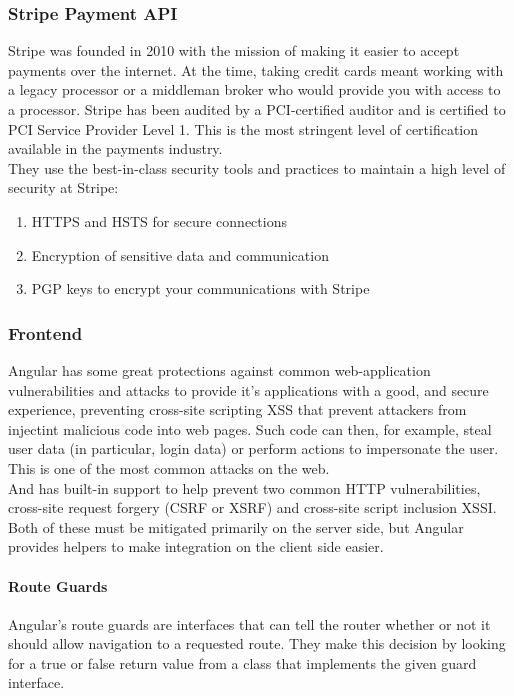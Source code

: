 \subsubsection{Stripe Payment API}
Stripe was founded in 2010 with the mission of making it easier to accept payments over the internet. At the time, taking credit cards meant working with a legacy processor or a middleman broker who would provide you with access to a processor.
Stripe has been audited by a PCI-certified auditor and is certified to PCI Service Provider Level 1. This is the most stringent level of certification available in the payments industry. \\
They use the best-in-class security tools and practices to maintain a high level of security at Stripe:
\begin{enumerate}
      \item HTTPS and HSTS for secure connections
      \item Encryption of sensitive data and communication
      \item PGP keys to encrypt your communications with Stripe
\end{enumerate}
\subsubsection{Frontend}
Angular has some great protections against common web-application vulnerabilities and attacks to provide it's applications with a good, and secure experience, preventing cross-site scripting \ac{XSS} that prevent attackers from injectint malicious code into web pages. Such code can then, for example, steal user data (in particular, login data) or perform actions to impersonate the user. This is one of the most common attacks on the web.\\
And has built-in support to help prevent two common HTTP vulnerabilities, cross-site request forgery (\ac{CSRF} or XSRF) and cross-site script inclusion \ac{XSSI}. Both of these must be mitigated primarily on the server side, but Angular provides helpers to make integration on the client side easier.

\paragraph*{Route Guards}
Angular’s route guards are interfaces that can tell the router whether or not it should allow navigation to a requested route. They make this decision by looking for a true or false return value from a class that implements the given guard interface.
